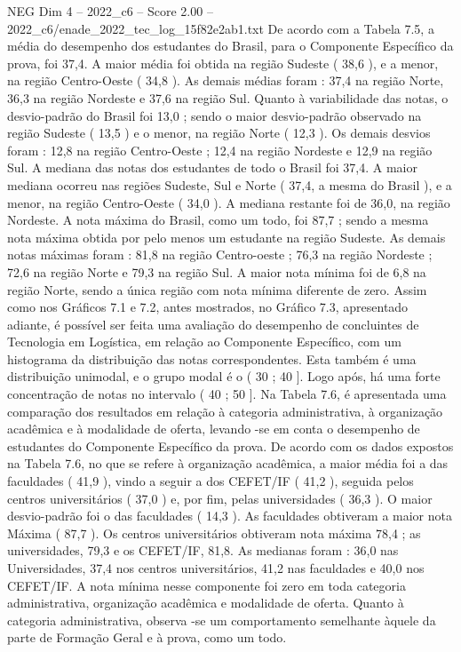 \begin{textsample}{NEG Dim 4 – 2022\_c6 – Score 2.00 – 2022\_c6/enade\_2022\_tec\_log\_15f82e2ab1.txt}
De acordo com a Tabela 7.5, a média do desempenho dos estudantes do Brasil, para o Componente Específico da prova, foi 37,4.
A maior média foi obtida na região Sudeste ( 38,6 ), e a menor, na região Centro-Oeste ( 34,8 ).
As demais médias foram : 37,4 na região Norte, 36,3 na região Nordeste e 37,6 na região Sul.
Quanto à variabilidade das notas, o desvio-padrão do Brasil foi 13,0 ; sendo o maior desvio-padrão observado na região Sudeste ( 13,5 ) e o menor, na região Norte ( 12,3 ).
Os demais desvios foram : 12,8 na região Centro-Oeste ; 12,4 na região Nordeste e 12,9 na região Sul.
A mediana das notas dos estudantes de todo o Brasil foi 37,4.
A maior mediana ocorreu nas regiões Sudeste, Sul e Norte ( 37,4, a mesma do Brasil ), e a menor, na região Centro-Oeste ( 34,0 ).
A mediana restante foi de 36,0, na região Nordeste.
A nota máxima do Brasil, como um todo, foi 87,7 ; sendo a mesma nota máxima obtida por pelo menos um estudante na região Sudeste.
As demais notas máximas foram : 81,8 na região Centro-oeste ; 76,3 na região Nordeste ; 72,6 na região Norte e 79,3 na região Sul.
A maior nota mínima foi de 6,8 na região Norte, sendo a única região com nota mínima diferente de zero.
Assim como nos Gráficos 7.1 e 7.2, antes mostrados, no Gráfico 7.3, apresentado adiante, é possível ser feita uma avaliação do desempenho de concluintes de Tecnologia em Logística, em relação ao Componente Específico, com um histograma da distribuição das notas correspondentes.
Esta também é uma distribuição unimodal, e o grupo modal é o ( 30 ; 40 ].
Logo após, há uma forte concentração de notas no intervalo ( 40 ; 50 ].
Na Tabela 7.6, é apresentada uma comparação dos resultados em relação à categoria administrativa, à organização acadêmica e à modalidade de oferta, levando -se em conta o desempenho de estudantes do Componente Específico da prova.
De acordo com os dados expostos na Tabela 7.6, no que se refere à organização acadêmica, a maior média foi a das faculdades ( 41,9 ), vindo a seguir a dos CEFET/IF ( 41,2 ), seguida pelos centros universitários ( 37,0 ) e, por fim, pelas universidades ( 36,3 ).
O maior desvio-padrão foi o das faculdades ( 14,3 ).
As faculdades obtiveram a maior nota Máxima ( 87,7 ).
Os centros universitários obtiveram nota máxima 78,4 ; as universidades, 79,3 e os CEFET/IF, 81,8.
As medianas foram : 36,0 nas Universidades, 37,4 nos centros universitários, 41,2 nas faculdades e 40,0 nos CEFET/IF.
A nota mínima nesse componente foi zero em toda categoria administrativa, organização acadêmica e modalidade de oferta.
Quanto à categoria administrativa, observa -se um comportamento semelhante àquele da parte de Formação Geral e à prova, como um todo.

\end{textsample}
